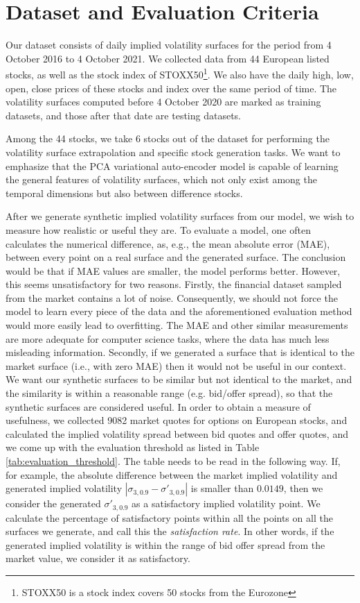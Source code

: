 \documentclass[format=sigconf]{acmart}
\begin{document}
\section{Dataset and Evaluation Criteria}
\label{sec:data}
Our dataset consists of daily implied volatility surfaces for the period from 4 October 2016 to 4 October 2021. We collected data from 44 European listed stocks, as well as the stock index of STOXX50\footnote{STOXX50 is a stock index covers 50 stocks from the Eurozone}. We also have the daily high, low, open, close prices of these stocks and index over the same period of time. The volatility surfaces computed before 4 October 2020 are marked as training datasets, and those after that date are testing datasets.

Among the 44 stocks, we take 6 stocks out of the dataset for performing the volatility surface extrapolation and specific stock generation tasks. We want to emphasize that the PCA variational auto-encoder model is capable of learning the general features of volatility surfaces, which not only exist among the temporal dimensions but also between difference stocks.

After we generate synthetic implied volatility surfaces from our model, we wish to measure how realistic or useful they are. To evaluate a model, one often calculates the numerical difference, as, e.g., the mean absolute error (MAE), between every point on a real surface and the generated surface. The conclusion would be that if MAE values are smaller, the model performs better. However, this seems unsatisfactory for two reasons. Firstly, the financial dataset sampled from the market contains a lot of noise. Consequently, we should not force the model to learn every piece of the data and the aforementioned evaluation method would more easily lead to overfitting. 
The MAE and other similar measurements are more adequate for computer science tasks, where the data has much less misleading information. Secondly, if we generated a surface that is identical to the market surface (i.e., with zero MAE) then it would not be useful in our context. We want our synthetic surfaces to be similar but not identical to the market, and the similarity is within a reasonable range (e.g. bid/offer spread), so that the synthetic surfaces are considered useful. In order to obtain a measure of usefulness, we collected 9082 market quotes for options on European stocks, and calculated the implied volatility spread between bid quotes and offer quotes, and we come up with the evaluation threshold as listed in Table \ref{tab:evaluation_threshold}. The table needs to be read in the following way. If, for example, the absolute difference between the market implied volatility and generated implied volatility $|\sigma_{3,0.9} - \sigma'_{3,0.9}|$ is smaller than $0.0149$, then we consider the generated $\sigma'_{3,0.9}$ as a satisfactory implied volatility point. We calculate the percentage of satisfactory points within all the points on all the surfaces we generate, and call this the \emph{satisfaction rate}. In other words, if the generated implied volatility is within the range of bid offer spread from the market value, we consider it as satisfactory.  
 
\end{document}
